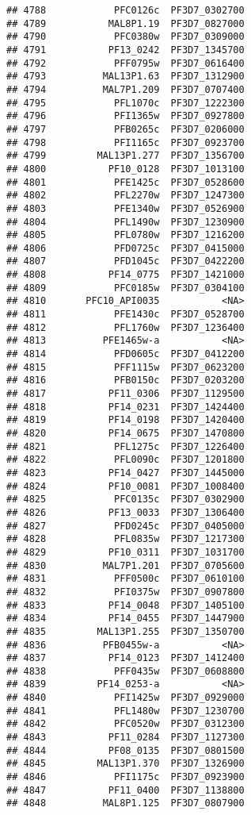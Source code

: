 \documentclass[12pt, a4paper]{article}\usepackage[]{graphicx}\usepackage[]{color}
\makeatletter
\newenvironment{kframe}{%
 \def\at@end@of@kframe{}%
 \ifinner\ifhmode%
  \def\at@end@of@kframe{\end{minipage}}%
  \begin{minipage}{\columnwidth}%
 \fi\fi%
 \def\FrameCommand##1{\hskip\@totalleftmargin \hskip-\fboxsep
 \colorbox{shadecolor}{##1}\hskip-\fboxsep
     \hskip-\linewidth \hskip-\@totalleftmargin \hskip\columnwidth}%
 \MakeFramed {\advance\hsize-\width
   \@totalleftmargin\z@ \linewidth\hsize
   \@setminipage}}%
 {\par\unskip\endMakeFramed%
 \at@end@of@kframe}
\newenvironment{knitrout}{}{} %
\makeatother
\begin{document}
\begin{knitrout}
\begin{kframe}
\begin{verbatim}
## 4788            PFC0126c  PF3D7_0302700
## 4789           MAL8P1.19  PF3D7_0827000
## 4790            PFC0380w  PF3D7_0309000
## 4791           PF13_0242  PF3D7_1345700
## 4792            PFF0795w  PF3D7_0616400
## 4793          MAL13P1.63  PF3D7_1312900
## 4794          MAL7P1.209  PF3D7_0707400
## 4795            PFL1070c  PF3D7_1222300
## 4796            PFI1365w  PF3D7_0927800
## 4797            PFB0265c  PF3D7_0206000
## 4798            PFI1165c  PF3D7_0923700
## 4799         MAL13P1.277  PF3D7_1356700
## 4800           PF10_0128  PF3D7_1013100
## 4801            PFE1425c  PF3D7_0528600
## 4802            PFL2270w  PF3D7_1247300
## 4803            PFE1340w  PF3D7_0526900
## 4804            PFL1490w  PF3D7_1230900
## 4805            PFL0780w  PF3D7_1216200
## 4806            PFD0725c  PF3D7_0415000
## 4807            PFD1045c  PF3D7_0422200
## 4808           PF14_0775  PF3D7_1421000
## 4809            PFC0185w  PF3D7_0304100
## 4810       PFC10_API0035           <NA>
## 4811            PFE1430c  PF3D7_0528700
## 4812            PFL1760w  PF3D7_1236400
## 4813          PFE1465w-a           <NA>
## 4814            PFD0605c  PF3D7_0412200
## 4815            PFF1115w  PF3D7_0623200
## 4816            PFB0150c  PF3D7_0203200
## 4817           PF11_0306  PF3D7_1129500
## 4818           PF14_0231  PF3D7_1424400
## 4819           PF14_0198  PF3D7_1420400
## 4820           PF14_0675  PF3D7_1470800
## 4821            PFL1275c  PF3D7_1226400
## 4822            PFL0090c  PF3D7_1201800
## 4823           PF14_0427  PF3D7_1445000
## 4824           PF10_0081  PF3D7_1008400
## 4825            PFC0135c  PF3D7_0302900
## 4826           PF13_0033  PF3D7_1306400
## 4827            PFD0245c  PF3D7_0405000
## 4828            PFL0835w  PF3D7_1217300
## 4829           PF10_0311  PF3D7_1031700
## 4830          MAL7P1.201  PF3D7_0705600
## 4831            PFF0500c  PF3D7_0610100
## 4832            PFI0375w  PF3D7_0907800
## 4833           PF14_0048  PF3D7_1405100
## 4834           PF14_0455  PF3D7_1447900
## 4835         MAL13P1.255  PF3D7_1350700
## 4836          PFB0455w-a           <NA>
## 4837           PF14_0123  PF3D7_1412400
## 4838            PFF0435w  PF3D7_0608800
## 4839         PF14_0253-a           <NA>
## 4840            PFI1425w  PF3D7_0929000
## 4841            PFL1480w  PF3D7_1230700
## 4842            PFC0520w  PF3D7_0312300
## 4843           PF11_0284  PF3D7_1127300
## 4844           PF08_0135  PF3D7_0801500
## 4845         MAL13P1.370  PF3D7_1326900
## 4846            PFI1175c  PF3D7_0923900
## 4847           PF11_0400  PF3D7_1138800
## 4848          MAL8P1.125  PF3D7_0807900

\end{verbatim}
\end{kframe}
\end{knitrout}
\end{document}
